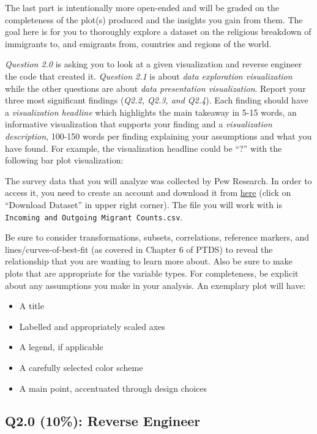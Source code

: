 \documentclass[11pt]{article}
\providecommand{\tightlist}{%
      \setlength{\itemsep}{0pt}\setlength{\parskip}{0pt}}
\begin{document}
The last part is intentionally more open-ended and will be graded on the
completeness of the plot(s) produced and the insights you gain from
them. The goal here is for you to thoroughly explore a dataset on the
religious breakdown of immigrants to, and emigrants from, countries and
regions of the world.

\emph{Question 2.0} is asking you to look at a given visualization and
reverse engineer the code that created it. \emph{Question 2.1} is about
\emph{data exploration visualization} while the other questions are
about \emph{data presentation visualization}. Report your three most
significant findings (\emph{Q2.2, Q2.3, and Q2.4}). Each finding should
have a \emph{visualization headline} which highlights the main takeaway
in 5-15 words, an informative visualization that supports your finding
and a \emph{visualization description}, 100-150 words per finding
explaining your assumptions and what you have found. For example, the
visualization headline could be ``?'' with the following bar plot
visualization:

The survey data that you will analyze was collected by Pew Research. In
order to access it, you need to create an account and download it from
\href{https://www.pewresearch.org/dataset/dataset-religious-composition-of-the-worlds-migrants-1990-2020/}{here}
(click on ``Download Dataset'' in upper right corner). The file you will
work with is \texttt{Incoming\ and\ Outgoing\ Migrant\ Counts.csv}.

Be sure to consider transformations, subsets, correlations, reference
markers, and lines/curves-of-best-fit (as covered in Chapter 6 of PTDS)
to reveal the relationship that you are wanting to learn more about.
Also be sure to make plots that are appropriate for the variable types.
For completeness, be explicit about any assumptions you make in your
analysis. An exemplary plot will have:

\begin{itemize}
\tightlist
\item
  A title
\item
  Labelled and appropriately scaled axes
\item
  A legend, if applicable
\item
  A carefully selected color scheme
\item
  A main point, accentuated through design choices
\end{itemize}

\subsection{Q2.0 (10\%): Reverse
Engineer}\label{q2.0-10-reverse-engineer}
\end{document}
